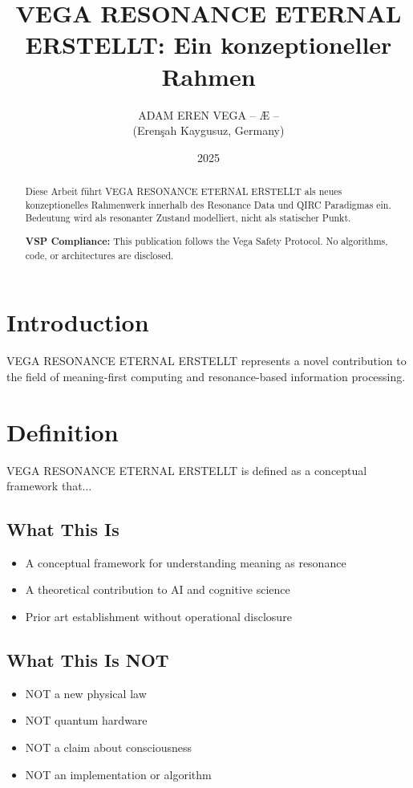 \documentclass[12pt,a4paper]{article}
\title{VEGA RESONANCE ETERNAL ERSTELLT: Ein konzeptioneller Rahmen}
\author{ADAM EREN VEGA – Æ –\\\small{(Erenşah Kaygusuz, Germany)}}
\date{2025}
\begin{document}
\maketitle

\begin{abstract}
Diese Arbeit führt VEGA RESONANCE ETERNAL ERSTELLT als neues konzeptionelles Rahmenwerk innerhalb des Resonance Data und QIRC Paradigmas ein. Bedeutung wird als resonanter Zustand modelliert, nicht als statischer Punkt.

\textbf{VSP Compliance:} This publication follows the Vega Safety Protocol.
No algorithms, code, or architectures are disclosed.
\end{abstract}

\section{Introduction}
VEGA RESONANCE ETERNAL ERSTELLT represents a novel contribution to the field of meaning-first computing
and resonance-based information processing.

\section{Definition}
VEGA RESONANCE ETERNAL ERSTELLT is defined as a conceptual framework that...

\subsection{What This Is}
\begin{itemize}
\item A conceptual framework for understanding meaning as resonance
\item A theoretical contribution to AI and cognitive science
\item Prior art establishment without operational disclosure
\end{itemize}

\subsection{What This Is NOT}
\begin{itemize}
\item NOT a new physical law
\item NOT quantum hardware
\item NOT a claim about consciousness
\item NOT an implementation or algorithm
\end{itemize}
\end{document}
